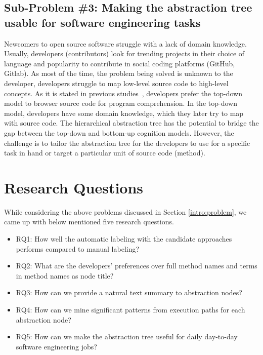    
    \subsection{Sub-Problem \#3: Making the abstraction tree usable for software engineering tasks} 
    
    Newcomers to open source software struggle with a lack of domain knowledge. Usually, developers (contributors) look for trending projects in their choice of language and popularity to contribute in social coding platforms (GitHub, Gitlab). As most of the time, the problem being solved is unknown to the developer, developers struggle to map low-level source code to high-level concepts. As it is stated in previous studies~\cite{brooks1983theoryComprehensionPrograms}, developers prefer the top-down model to browser source code for program comprehension. In the top-down model, developers have some domain knowledge, which they later try to map with source code. The hierarchical abstraction tree has the potential to bridge the gap between the top-down and bottom-up cognition models. However, the challenge is to tailor the abstraction tree for the developers to use for a specific task in hand or target a particular unit of source code (method). 
    
    
\section{Research Questions}   
\label{intro:research_questions}
While considering the above problems discussed in Section \ref{intro:problem}, we came up with below mentioned five research questions.
\begin{itemize}
    \item RQ1: How well the automatic labeling with the candidate approaches performs compared to manual labeling?
    \item RQ2: What are the developers' preferences over full method names and terms in method names as node title?
    
    \item RQ3: How can we provide a natural text summary to abstraction nodes?
    \item RQ4: How can we mine significant patterns from execution paths for each abstraction node?
    \item RQ5: How can we make the abstraction tree useful for daily day-to-day software engineering jobs?
    
\end{itemize}

